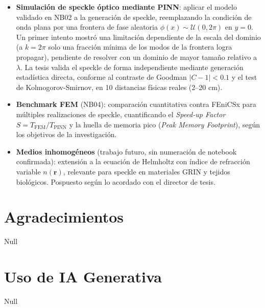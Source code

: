 \begin{itemize}
  \item \textbf{Simulación de speckle óptico mediante PINN}: aplicar el modelo validado
    en NB02 a la generación de speckle, reemplazando la condición de onda plana por una
    frontera de fase aleatoria $\phi(x) \sim \mathcal{U}(0, 2\pi)$ en $y = 0$. Un primer
    intento mostró una limitación dependiente de la escala del dominio (a $k=2\pi$ solo
    una fracción mínima de los modos de la frontera logra propagar), pendiente de
    resolver con un dominio de mayor tamaño relativo a $\lambda$. La tesis valida el
    speckle de forma independiente mediante generación estadística directa, conforme al
    contraste de Goodman $|C - 1| < 0.1$ y el test de Kolmogorov-Smirnov, en 10
    distancias físicas reales (2--20 cm).

  \item \textbf{Benchmark FEM} (NB04): comparación cuantitativa contra FEniCSx para
    múltiples realizaciones de speckle, cuantificando el \textit{Speed-up Factor}
    $S = T_{\mathrm{FEM}} / T_{\mathrm{PINN}}$ \cite{Thuerey2021_PBDL} y la
    huella de memoria pico (\textit{Peak Memory Footprint}), según los objetivos
    de la investigación.

  \item \textbf{Medios inhomogéneos} (trabajo futuro, sin numeración de notebook
    confirmada): extensión a la ecuación de Helmholtz con índice de refracción
    variable $n(\mathbf{r})$, relevante para speckle en materiales GRIN y tejidos
    biológicos. Pospuesto según lo acordado con el director de tesis.
\end{itemize}

\section*{Agradecimientos}

Null

\section*{Uso de IA Generativa}

Null
